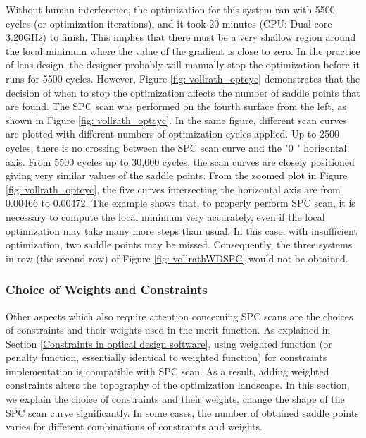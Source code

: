Without human interference, the optimization for this system ran with 5500 cycles (or optimization iterations), and it took 20 minutes (CPU: Dual-core 3.20GHz) to finish. This implies that there must be a very shallow region around the local minimum where the value of the gradient is close to zero. In the practice of lens design, the designer probably will manually stop the optimization before it runs for 5500 cycles. However, Figure \ref{fig: vollrath_optcyc} demonstrates that the decision of when to stop the optimization affects the number of saddle points that are found. The SPC scan was performed on the fourth surface from the left, as shown in Figure \ref{fig: vollrath_optcyc}. In the same figure, different scan curves are plotted with different numbers of optimization cycles applied. Up to 2500 cycles, there is no crossing between the SPC scan curve and the "$0$ " horizontal axis. From 5500 cycles up to 30,000 cycles, the scan curves are closely positioned giving very similar values of the saddle points. From the zoomed plot in Figure \ref{fig: vollrath_optcyc}, the five curves intersecting the horizontal axis are from 0.00466 to 0.00472. The example shows that, to properly perform SPC scan, it is necessary to compute the local minimum very accurately, even if the local optimization may take many more steps than usual. In this case, with insufficient optimization, two saddle points may be missed. Consequently, the three systems in row  (the second row) of Figure \ref{fig: vollrathWDSPC} would not be obtained. 

\subsubsection{Choice of Weights and Constraints}
Other aspects which also require attention concerning SPC scans are the choices of constraints and their weights used in the merit function. As explained in Section \ref{Constraints in optical design software}, using weighted function (or penalty function, essentially identical to weighted function) for constraints implementation is compatible with SPC scan. As a result, adding weighted constraints alters the topography of the optimization landscape.  In this section, we explain the choice of constraints and their weights, change the shape of the SPC scan curve significantly. In some cases, the number of obtained saddle points varies for different combinations of constraints and weights. 

